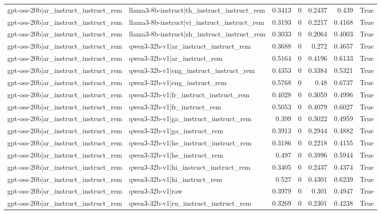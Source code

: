 \begin{table}
\begin{tabular}{l l r r r r l}
gpt-oss-20b|ar_instruct_instruct_rem & llama3-8b-instruct|th_instruct_instruct_rem & 0.3413 & 0 & 0.2437 & 0.439 & True \\
gpt-oss-20b|ar_instruct_instruct_rem & llama3-8b-instruct|vi_instruct_instruct_rem & 0.3193 & 0 & 0.2217 & 0.4168 & True \\
gpt-oss-20b|ar_instruct_instruct_rem & llama3-8b-instruct|zh_instruct_instruct_rem & 0.3033 & 0 & 0.2064 & 0.4003 & True \\
gpt-oss-20b|ar_instruct_instruct_rem & qwen3-32b-v1|ar_instruct_instruct_rem & 0.3688 & 0 & 0.272 & 0.4657 & True \\
gpt-oss-20b|ar_instruct_instruct_rem & qwen3-32b-v1|ar_instruct_rem & 0.5164 & 0 & 0.4196 & 0.6133 & True \\
gpt-oss-20b|ar_instruct_instruct_rem & qwen3-32b-v1|eng_instruct_instruct_rem & 0.4353 & 0 & 0.3384 & 0.5321 & True \\
gpt-oss-20b|ar_instruct_instruct_rem & qwen3-32b-v1|eng_instruct_rem & 0.5768 & 0 & 0.48 & 0.6737 & True \\
gpt-oss-20b|ar_instruct_instruct_rem & qwen3-32b-v1|fr_instruct_instruct_rem & 0.4028 & 0 & 0.3059 & 0.4996 & True \\
gpt-oss-20b|ar_instruct_instruct_rem & qwen3-32b-v1|fr_instruct_rem & 0.5053 & 0 & 0.4079 & 0.6027 & True \\
gpt-oss-20b|ar_instruct_instruct_rem & qwen3-32b-v1|ga_instruct_instruct_rem & 0.399 & 0 & 0.3022 & 0.4959 & True \\
gpt-oss-20b|ar_instruct_instruct_rem & qwen3-32b-v1|ga_instruct_rem & 0.3913 & 0 & 0.2944 & 0.4882 & True \\
gpt-oss-20b|ar_instruct_instruct_rem & qwen3-32b-v1|he_instruct_instruct_rem & 0.3186 & 0 & 0.2218 & 0.4155 & True \\
gpt-oss-20b|ar_instruct_instruct_rem & qwen3-32b-v1|he_instruct_rem & 0.497 & 0 & 0.3996 & 0.5944 & True \\
gpt-oss-20b|ar_instruct_instruct_rem & qwen3-32b-v1|hi_instruct_instruct_rem & 0.3405 & 0 & 0.2437 & 0.4374 & True \\
gpt-oss-20b|ar_instruct_instruct_rem & qwen3-32b-v1|hi_instruct_rem & 0.527 & 0 & 0.4301 & 0.6239 & True \\
gpt-oss-20b|ar_instruct_instruct_rem & qwen3-32b-v1|raw & 0.3979 & 0 & 0.301 & 0.4947 & True \\
gpt-oss-20b|ar_instruct_instruct_rem & qwen3-32b-v1|ru_instruct_instruct_rem & 0.3269 & 0 & 0.2301 & 0.4238 & True \\

\end{tabular}
\end{table}
